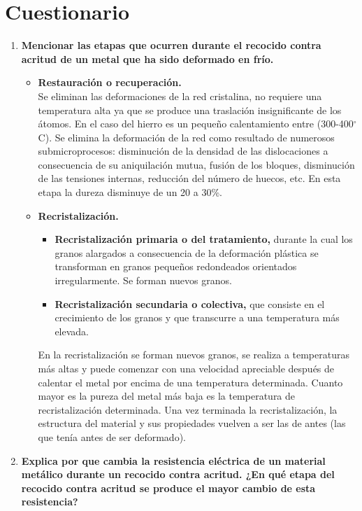 \documentclass[a4paper,12pt]{report}
\begin{document}
\section{Cuestionario}
\begin{enumerate}
\item \textbf{Mencionar las etapas que ocurren durante el recocido contra acritud de un metal que ha sido deformado en frío.}\\
\begin{itemize}
\item \textbf{Restauración o recuperación.}\\
Se eliminan las deformaciones de la red cristalina, no requiere una temperatura alta ya que se produce una traslación insignificante de los átomos. En el caso del hierro es un pequeño calentamiento entre (300-400$^{\circ}$C). Se elimina la deformación de la red como resultado de numerosos submicroprocesos: disminución de la densidad de las dislocaciones a consecuencia de su aniquilación mutua, fusión de los bloques, disminución de las tensiones internas, reducción del número de huecos, etc. En esta etapa la dureza disminuye de un 20 a 30\%.
\item \textbf{Recristalización.}
\begin{itemize}
\item \textbf{Recristalización primaria o del tratamiento,} durante la cual los granos alargados a consecuencia de la deformación plástica se transforman en granos pequeños redondeados orientados irregularmente. Se forman nuevos granos.
\item \textbf{Recristalización secundaria o colectiva,} que consiste en el crecimiento de los granos y que transcurre a una temperatura más elevada.
\end{itemize}
En la recristalización se forman nuevos granos, se realiza a temperaturas más altas y puede comenzar con una velocidad apreciable después de calentar el metal por encima de una temperatura determinada. Cuanto mayor es la pureza del metal más baja es la temperatura de recristalización determinada. Una vez terminada la recristalización, la estructura del material y sus propiedades vuelven a ser las de antes (las que tenía antes de ser deformado). 
\end{itemize}
\item \textbf{Explica por que cambia la resistencia eléctrica de un material metálico durante un recocido contra acritud. ¿En qué etapa del recocido contra acritud se produce el mayor cambio de esta resistencia?}\\

\end{enumerate}
\end{document}
